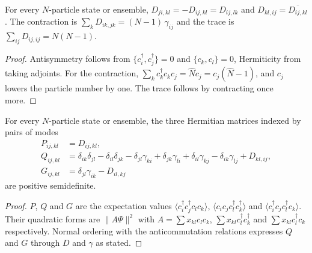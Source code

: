 \begin{theorem}\label{thm:rdm2-basic}
  \leanok
  For every $N$-particle state or ensemble,
  $D_{ji,kl}=-D_{ij,kl}=D_{ij,lk}$ and $D_{kl,ij}=\overline{D_{ij,kl}}$. The contraction is
  $\sum_kD_{ik,jk}=(N-1)\,\gamma_{ij}$ and the trace is $\sum_{ij}D_{ij,ij}=N(N-1)$.
\end{theorem}
\begin{proof}\leanok
  Antisymmetry follows from $\{c_i^\dagger,c_j^\dagger\}=0$ and $\{c_k,c_l\}=0$, Hermiticity from taking adjoints. For the
  contraction, $\sum_kc_k^\dagger c_kc_j=\hat Nc_j=c_j(\hat N-1)$, and $c_j$ lowers the particle number by one. The trace
  follows by contracting once more.
\end{proof}

\begin{theorem}\label{thm:pqg}
  \leanok
  For every $N$-particle state or ensemble, the three Hermitian matrices indexed by pairs of modes
  \begin{align*}
    P_{ij,kl}&=D_{ij,kl},\\
    Q_{ij,kl}&=\delta_{ik}\delta_{jl}-\delta_{il}\delta_{jk}-\delta_{jl}\gamma_{ki}+\delta_{jk}\gamma_{li}+\delta_{il}\gamma_{kj}
      -\delta_{ik}\gamma_{lj}+D_{kl,ij},\\
    G_{ij,kl}&=\delta_{jl}\gamma_{ik}-D_{il,kj}
  \end{align*}
  are positive semidefinite.
\end{theorem}
\begin{proof}\leanok
  $P$, $Q$ and $G$ are the expectation values $\langle c_i^\dagger c_j^\dagger c_lc_k\rangle$, $\langle c_ic_jc_l^\dagger c_k^\dagger\rangle$
  and $\langle c_i^\dagger c_jc_l^\dagger c_k\rangle$. Their quadratic forms are $\|A\Psi\|^2$ with $A=\sum x_{kl}c_lc_k$,
  $\sum x_{kl}c_l^\dagger c_k^\dagger$ and $\sum x_{kl}c_l^\dagger c_k$ respectively. Normal ordering with the anticommutation
  relations expresses $Q$ and $G$ through $D$ and $\gamma$ as stated.
\end{proof}

